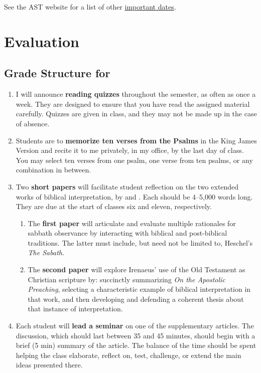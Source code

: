 \documentclass[titlepage]{article}
\begin{document}
See the AST website for a list of other \href{http://www.astheology.ns.ca/students/academic-dates.html}{important dates}.

\section{Evaluation}
\label{evaluation}

\subsection{Grade Structure for \ccode}
\label{structure}

\begin{enumerate}

	\item I will announce \textbf{reading quizzes} throughout the
	semester, as often as once a week. They are designed to ensure that
	you have read the assigned material carefully. Quizzes are given in
	class, and they may not be made up in the case of absence.

	\item Students are to \textbf{memorize ten verses from the Psalms}
	in the King James Version and recite it to me privately, in my
	office, by the last day of class. You may select ten verses from one
	psalm, one verse from ten psalms, or any combination in between.

	\item Two \textbf{short papers} will facilitate student reflection
	on the two extended works of biblical interpretation, by
	\cite{heschel} and \cite{irenaeus}. Each should be 4--5,000 words
	long. They are due at the start of classes six and eleven,
	respectively.

	\begin{enumerate}

		\item The \textbf{first paper} will articulate and evaluate
		multiple rationales for sabbath observance by interacting with
		biblical and post-biblical traditions. The latter must include,
		but need not be limited to, Heschel's \emph{The Sabath}.

		\item The \textbf{second paper} will explore Irenaeus' use of
		the Old Testament as Christian scripture by: succinctly
		summarizing \emph{On the Apostolic Preaching}, selecting a
		characteristic example of biblical interpretation in that work,
		and then developing and defending a coherent thesis about that
		instance of interpretation.

	\end{enumerate}

	\item Each student will \textbf{lead a seminar} on one of the
	supplementary articles. The discussion, which should last between 35
	and 45 minutes, should begin with a brief (5 min) summary of the
	article. The balance of the time should be spent helping the class
	elaborate, reflect on, test, challenge, or extend the main ideas
	presented there.

\end{enumerate}
\end{document}
